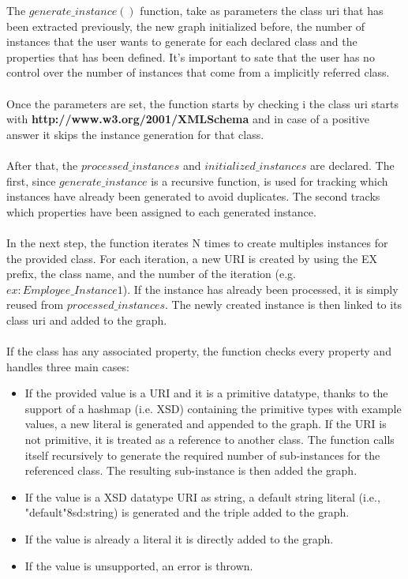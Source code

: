 The $generate\_instance()$ function, take as parameters the class uri that has been extracted previously, the new graph initialized before, the number of instances that the user wants to generate for each declared class and the properties that has been defined. 
It's important to sate that the user has no control over the number of instances that come from a implicitly referred class.
\\
\\
Once the parameters are set, the function starts by checking i the class uri starts with \textbf{http://www.w3.org/2001/XMLSchema} and in case of a positive answer it skips the instance generation for that class.
\\
\\
After that, the $processed\_instances$ and $initialized\_instances$ are declared. The first, since $generate\_instance$ is a recursive function, is used for tracking which instances have already been generated to avoid duplicates. 
The second tracks which properties have been assigned to each generated instance.
\\
\\
In the next step, the function iterates N times to create multiples instances for the provided class. For each iteration, a new URI is created by using the EX prefix, the class name, and the number of the iteration (e.g. $ex:Employee\_Instance1$). If the instance has already been processed, it is simply reused from $processed\_instances$. The newly created instance is then linked to its class uri and added to the graph. 
\\
\\
If the class has any associated property, the function checks every property and handles three main cases: 
\begin{itemize}
	\item If the provided value is a URI and it is a primitive datatype, thanks to the support of a hashmap (i.e. XSD) containing the primitive types with example values, a new literal is generated and appended to the graph. If the URI is not primitive, it is treated as a reference to another class. The function calls itself recursively to generate the required number of sub-instances for the referenced class. The resulting sub-instance is then added the graph. 
	\item If the value is a XSD datatype URI as string, a default string literal (i.e., "default"^^xsd:string) is generated and the triple added to the graph.
	\item If the value is already a literal it is directly added to the graph.
	\item If the value is unsupported, an error is thrown.
\end{itemize}
